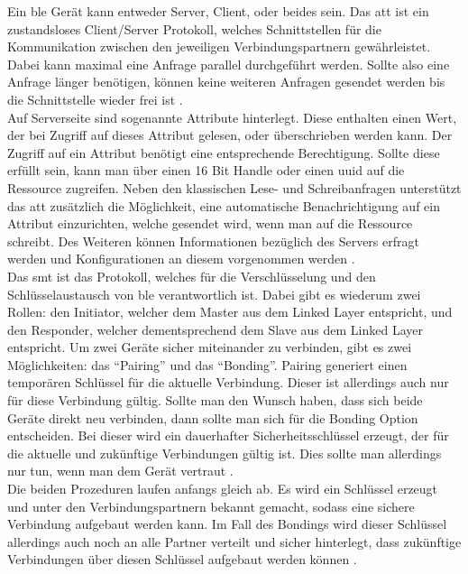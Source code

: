 \noindent Ein \ac{ble} Gerät kann entweder Server, Client, oder beides sein. Das \ac{att} ist ein zustandsloses Client/Server Protokoll, welches Schnittstellen für die Kommunikation zwischen den jeweiligen Verbindungspartnern gewährleistet. Dabei kann maximal eine Anfrage parallel durchgeführt werden. Sollte also eine Anfrage länger benötigen, können keine weiteren Anfragen gesendet werden bis die Schnittstelle wieder frei ist \cite[Seite 26]{Townsend14:GSB}.\\

\noindent Auf Serverseite sind sogenannte Attribute hinterlegt. Diese enthalten einen Wert, der bei Zugriff auf dieses Attribut gelesen, oder überschrieben werden kann. Der Zugriff auf ein Attribut benötigt eine entsprechende Berechtigung. Sollte diese erfüllt sein, kann man über einen 16 Bit Handle oder einen \ac{uuid} auf die Ressource zugreifen. Neben den klassischen Lese- und Schreibanfragen unterstützt das \ac{att} zusätzlich die Möglichkeit, eine automatische Benachrichtigung auf ein Attribut einzurichten, welche gesendet wird, wenn man auf die Ressource schreibt. Des Weiteren können Informationen bezüglich des Servers erfragt werden und Konfigurationen an diesem vorgenommen werden \cite[Seite 26ff]{Townsend14:GSB}.\\

\noindent Das \ac{smt} ist das Protokoll, welches für die Verschlüsselung und den Schlüsselaustausch von \ac{ble} verantwortlich ist. Dabei gibt es wiederum zwei Rollen: den Initiator, welcher dem Master aus dem Linked Layer entspricht, und den Responder, welcher dementsprechend dem Slave aus dem Linked Layer entspricht. Um zwei Geräte sicher miteinander zu verbinden, gibt es zwei Möglichkeiten: das "`Pairing"' und das "`Bonding"'. Pairing generiert einen temporären Schlüssel für die aktuelle Verbindung. Dieser ist allerdings auch nur für diese Verbindung gültig. Sollte man den Wunsch haben, dass sich beide Geräte direkt neu verbinden, dann sollte man sich für die Bonding Option entscheiden. Bei dieser wird ein dauerhafter Sicherheitsschlüssel erzeugt, der für die aktuelle und zukünftige Verbindungen gültig ist. Dies sollte man allerdings nur tun, wenn man dem Gerät vertraut \cite[Seite 28]{Townsend14:GSB}.\\

\noindent Die beiden Prozeduren laufen anfangs gleich ab. Es wird ein Schlüssel erzeugt und unter den Verbindungspartnern bekannt gemacht, sodass eine sichere Verbindung aufgebaut werden kann. Im Fall des Bondings wird dieser Schlüssel allerdings auch noch an alle Partner verteilt und sicher hinterlegt, dass zukünftige Verbindungen über diesen Schlüssel aufgebaut werden können \cite[Seite 29]{Townsend14:GSB}.\\ 

